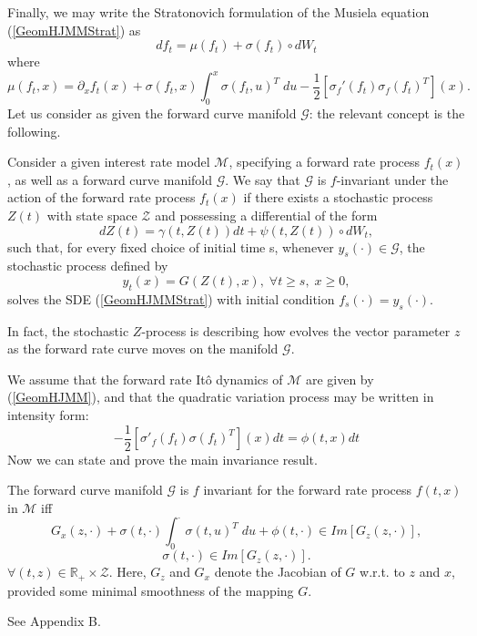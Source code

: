 Finally, we may write the Stratonovich formulation of the Musiela
equation 
(\ref{GeomHJMMStrat}) as \begin{equation}
\label{GeomHJMStratSimple}
df_t=\mu(f_t)+\sigma(f_t)\circ dW_t
\end{equation}
where
\begin{equation}
\label{DriftGeomHJMStratSimple}
\mu(f_t,x)=\partial_x f_t(x)+ \sigma(f_t,x)\int_0^x \sigma(f_t,u)^T\;
du-\frac{1}{2} \left[\sigma_f'(f_t)\sigma_f(f_t)^T \right](x).
\end{equation}
Let us consider as given the forward curve manifold $\mathcal{G}$: the
relevant concept is the following.
\begin{defn}
Consider a given interest rate model $\mathcal{M}$, specifying a
forward rate process $f_t(x)$, as well as a forward curve manifold
$\mathcal{G}$. We say that $\mathcal{G}$ is $f$-invariant under the
action of the forward rate process $f_t(x)$ if there exists a
stochastic process $Z(t)$ with state space $\mathcal{Z}$ and
possessing a  differential of the form
\begin{equation}
\label{FDR}
dZ(t)=\gamma(t, Z(t))dt + \psi(t, Z(t))\circ dW_t,
\end{equation}
such that, for every fixed choice of initial time s, whenever
$y_s(\cdot)\in\mathcal{G}$, the stochastic process defined by
\begin{equation}
\label{pepe}
y_t(x)=G(Z(t), x),\; \forall t \geq s, \; x\geq 0,
\end{equation}
solves the SDE (\ref{GeomHJMMStrat}) with initial condition
$f_s(\cdot)=y_s(\cdot)$.
\end{defn}
In fact, the stochastic $Z$-process is describing how evolves the
vector parameter $z$ as the forward rate curve moves on the manifold
$\mathcal{G}$. 

We assume that the forward rate It\^o dynamics of $\mathcal{M}$ are
given by (\ref{GeomHJMM}), and that the quadratic variation process
may be written in intensity form:
$$
-\frac{1}{2}\left[\sigma'_f(f_t) \sigma(f_t)^T \right](x) dt= \phi(t,x) dt 
$$
Now we can state and prove the main invariance result.
\begin{tma} The forward curve manifold
  $\mathcal{G}$ is $f$ invariant for the forward rate process $f(t,x)$
  in $\mathcal{M}$ iff
\begin{equation}
\label{CDC}
G_x(z, \cdot)+\sigma(t,\cdot) \displaystyle \int_0^\cdot \sigma(t,u)^T
\; du+\phi(t,\cdot) \in Im \left[G_z(z,\cdot) \right],
\end{equation}
\begin{equation}
\label{CVC}
\sigma(t,\cdot) \in Im \left[G_z(z,\cdot) \right].
\end{equation}
$\forall (t,z) \in \mathbb{R}_+ \times \mathcal{Z}$. Here, $G_z$ and
$G_x$ denote the Jacobian of $G$ w.r.t. to $z$ and $x$, provided some
minimal smoothness of the mapping $G$. 
\end{tma}
\begin{demo}
See Appendix B.
\end{demo}

